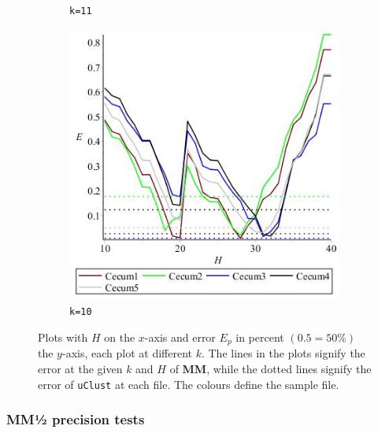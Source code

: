 \documentclass[../../main.tex]{subfiles}
\begin{document}
\begin{figure}[H]
\begin{subfigure}[b]{.5\textwidth}
\caption{\texttt{k=11}}
\end{subfigure}
\begin{subfigure}[b]{.5\textwidth}
\includegraphics[width=\textwidth]{precision/minmax/k11cecum}
\caption{\texttt{k=10}}
\end{subfigure}
\caption{Plots with $H$ on the $x$-axis and error $E_p$ in percent $(0.5 = 50\%)$ the $y$-axis, each plot at different $k$. The lines in the plots signify the error at the given $k$ and $H$ of {\bf MM}, while the dotted lines signify the error of \texttt{uClust} at each file. The colours define the sample file.}
\label{fig:allKminmax}
\end{figure}

\subsubsection{MM½ precision tests}
\end{document}
